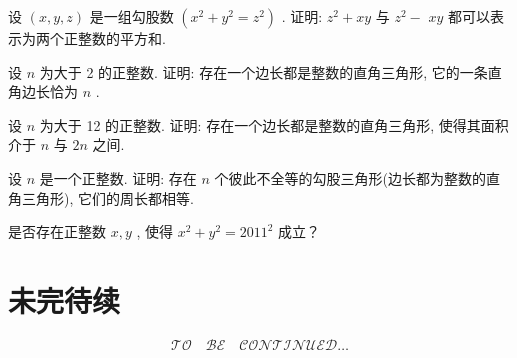 \documentclass[aspectratio=169]{ctexbeamer}
\theoremstyle{definition}
\begin{document}
\begin{frame}[t]
\begin{example}
	设 $(x, y, z)$ 是一组勾股数 $\left(x^{2}+y^{2}=z^{2}\right)$ . 证明: $z^{2}+x y$ 与 $z^{2}-$ $x y$ 都可以表示为两个正整数的平方和.
\end{example}
\end{frame}

\begin{frame}[t]
\begin{example}
	设 $n$ 为大于 2 的正整数. 证明: 存在一个边长都是整数的直角三角形, 它的一条直角边长恰为 $n$ .
\end{example}
\end{frame}

\begin{frame}[t]
\begin{example}
	设 $n$ 为大于 12 的正整数. 证明: 存在一个边长都是整数的直角三角形, 使得其面积介于 $n$ 与 $2 n$ 之间.
\end{example}
\end{frame}

\begin{frame}[t]
\begin{example}
	设 $n$ 是一个正整数. 证明: 存在 $n$ 个彼此不全等的勾股三角形(边长都为整数的直角三角形), 它们的周长都相等.
\end{example}
\end{frame}

\begin{frame}[t]
\begin{example}
	是否存在正整数 $x ,  y$ , 使得 $x^{2}+y^{2}=2011^{2}$ 成立？
\end{example}
\end{frame}

\section*{未完待续}
\begin{frame}
	\Huge
	$$
		\mathcal{TO}	\quad
		\mathcal{BE}  	\quad
		\mathcal{CONTINUED}
		\ldots
	$$
\end{frame}
\end{document}
